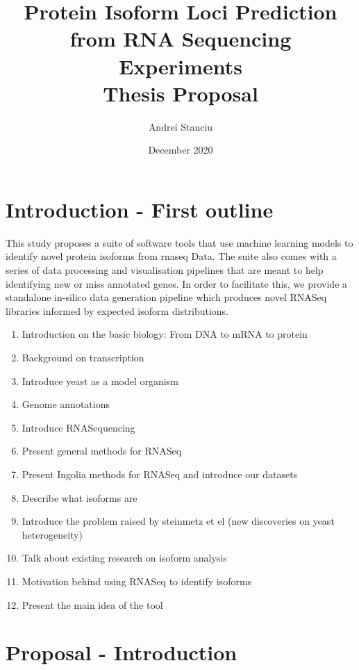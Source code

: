 \documentclass[12pt]{article}
\title{%
    Protein Isoform Loci Prediction from RNA Sequencing Experiments \\
    \large Thesis Proposal}
\author{Andrei Stanciu}
\date{December 2020}
\begin{document}
\maketitle

\section{Introduction - First outline}

This study proposes a suite of software tools that use machine learning models to identify novel protein isoforms from \gls{rnaseq} Data. The suite also comes with a series of data processing and visualisation pipelines that are meant to help identifying new or miss annotated genes. In order to facilitate this, we provide a standalone in-silico data generation pipeline which produces novel RNASeq libraries informed by expected isoform distributions. 

\begin{enumerate}
    \item Introduction on the basic biology: From DNA to mRNA to protein
    \item Background on transcription 
    \item Introduce yeast as a model organism
    \item Genome annotations
    \item Introduce RNASequencing
    \item Present general methods for RNASeq
    \item Present Ingolia methods for RNASeq and introduce our datasets
    \item Describe what isoforms are 
    \item Introduce the problem raised by steinmetz et el (new discoveries on yeast heterogeneity) 
    \item Talk about existing research on isoform analysis 
    \item Motivation behind using RNASeq to identify isoforms
    \item Present the main idea of the tool

\end{enumerate}


\section{Proposal - Introduction}
\end{document}
